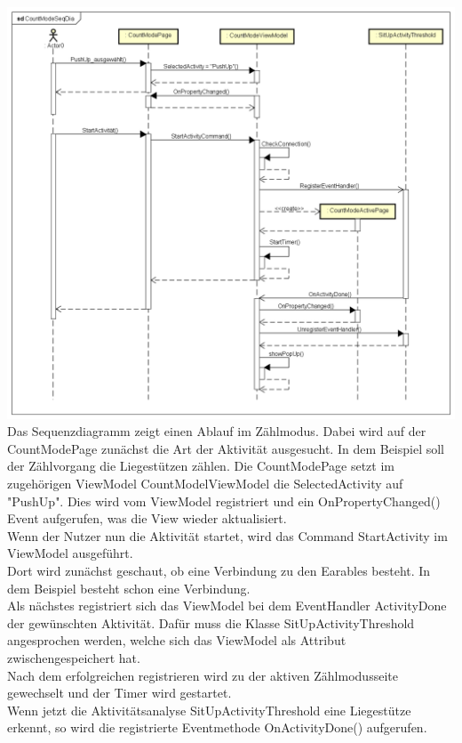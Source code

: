 \documentclass[a4paper,12pt]{article}
\begin{document}
\includegraphics[width=1.1\textwidth]{./Diagramme/CountModeSeqDia.png}\\
Das Sequenzdiagramm zeigt einen Ablauf im Zählmodus. Dabei wird auf der CountModePage zunächst die Art der Aktivität ausgesucht. In dem Beispiel soll der Zählvorgang die Liegestützen zählen.
Die CountModePage setzt im zugehörigen ViewModel CountModelViewModel die SelectedActivity auf "PushUp". Dies wird vom ViewModel registriert und ein OnPropertyChanged() Event aufgerufen, was die View wieder aktualisiert.\\
Wenn der Nutzer nun die Aktivität startet, wird das Command StartActivity im ViewModel ausgeführt.\\Dort wird zunächst geschaut, ob eine Verbindung zu den \gls{Earables} besteht. In dem Beispiel besteht schon eine Verbindung.\\
Als nächstes registriert sich das ViewModel bei dem EventHandler ActivityDone der gewünschten Aktivität. Dafür muss die Klasse SitUpActivityThreshold angesprochen werden, welche sich das ViewModel als Attribut zwischengespeichert hat.\\
Nach dem erfolgreichen registrieren wird zu der aktiven Zählmodusseite gewechselt und der Timer wird gestartet.\\
Wenn jetzt die Aktivitätsanalyse SitUpActivityThreshold eine Liegestütze erkennt, so wird die registrierte Eventmethode OnActivityDone() aufgerufen. 
\end{document}
